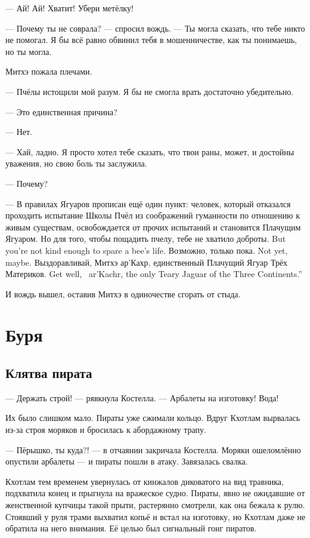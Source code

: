 --- Ай!
Ай!
Хватит!
Убери метёлку!

\textspace

--- Почему ты не соврала? --- спросил вождь.
--- Ты могла сказать, что тебе никто не помогал.
Я бы всё равно обвинил тебя в мошенничестве, как ты понимаешь, но ты могла.

Митхэ пожала плечами.

--- Пчёлы истощили мой разум.
Я бы не смогла врать достаточно убедительно.

--- Это единственная причина?

--- Нет.

--- Хай, ладно.
Я просто хотел тебе сказать, что твои раны, может, и достойны уважения, но свою боль ты заслужила.

--- Почему?

--- В правилах Ягуаров прописан ещё один пункт: человек, который отказался проходить испытание Школы Пчёл из соображений гуманности по отношению к живым существам, освобождается от прочих испытаний и становится Плачущим Ягуаром.
{Но для того, чтобы пощадить пчелу, тебе не хватило доброты.}
{But you're not kind enough to spare a bee's life.}
{Возможно, только пока.}
{Not yet, maybe.}
{Выздоравливай, Митхэ ар'Кахр, единственный Плачущий Ягуар Трёх Материков.}
{Get well, \Mitchoe\ ar'Kachr, the only Teary Jaguar of the Three Continents.''}

И вождь вышел, оставив Митхэ в одиночестве сгорать от стыда.

\chapter{Буря}

\section{Клятва пирата}

--- Держать строй! --- рявкнула Костелла.
--- Арбалеты на изготовку!
Вода!

Их было слишком мало.
Пираты уже сжимали кольцо.
Вдруг Кхотлам вырвалась из-за строя моряков и бросилась к абордажному трапу.

--- Пёрышко, ты куда?! --- в отчаянии закричала Костелла.
Моряки ошеломлённо опустили арбалеты --- и пираты пошли в атаку.
Завязалась свалка.

Кхотлам тем временем увернулась от кинжалов диковатого на вид травника, подхватила конец и прыгнула на вражеское судно.
Пираты, явно не ожидавшие от женственной купчицы такой прыти, растерянно смотрели, как она бежала к рулю.
Стоявший у руля трами выхватил копьё и встал на изготовку, но Кхотлам даже не обратила на него внимания.
Её целью был сигнальный гонг пиратов.

